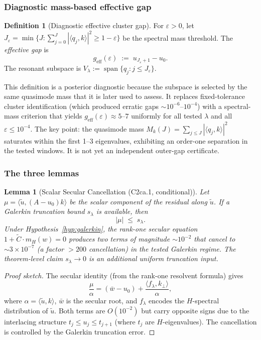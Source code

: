 \documentclass[11pt,a4paper]{article}
\theoremstyle{plain}
\newtheorem{lemma}[theorem]{Lemma}
\theoremstyle{definition}
\newtheorem{definition}[theorem]{Definition}
\begin{document}
\subsubsection{Diagnostic mass-based effective gap}

\begin{definition}[Diagnostic effective cluster gap]\label{def:geff}
For $\varepsilon > 0$, let $J_\varepsilon = \min\{J :
\sum_{j=0}^{J} |\langle q_j, k\rangle|^2 \geq 1 - \varepsilon\}$
be the spectral mass threshold.  The \emph{effective gap} is
\[
  g_{\mathrm{eff}}(\varepsilon) \;:=\; u_{J_\varepsilon + 1} - u_0.
\]
The resonant subspace is $V_\lambda := \operatorname{span}\{q_j :
j \leq J_\varepsilon\}$.
\end{definition}

This definition is a posterior diagnostic because the subspace is
selected by the same quasimode mass that it is later used to assess.
It replaces fixed-tolerance cluster identification
(which produced erratic gaps $\sim 10^{-6}$--$10^{-4}$) with a
spectral-mass criterion that yields $g_{\mathrm{eff}}(\varepsilon)
\approx 5$--$7$ uniformly for all tested $\lambda$ and all
$\varepsilon \leq 10^{-4}$.  The key point: the quasimode mass
$M_k(J) = \sum_{j \leq J} |\langle q_j, k\rangle|^2$ saturates
within the first 1--3 eigenvalues, exhibiting an order-one separation
in the tested windows.  It is not yet an independent outer-gap
certificate.

\subsubsection{The three lemmas}

\begin{lemma}[Scalar Secular Cancellation (C2ca.1, conditional)]
\label{lem:secular}
Let $\mu = \langle \tilde{u}, (A-u_0)k\rangle$ be the scalar
component of the residual along $\tilde{u}$.  If a Galerkin truncation
bound $s_\lambda$ is available, then
\[
  |\mu| \;\leq\; s_\lambda .
\]
Under Hypothesis~\ref{hyp:galerkin}, the rank-one secular equation
$1 + \tilde{C} \cdot m_H(w) = 0$ produces two terms of magnitude
$\sim 10^{-2}$ that cancel to $\sim 3 \times 10^{-7}$ (a factor
$> 200$ cancellation) in the tested Galerkin regime.  The theorem-level
claim $s_\lambda\to0$ is an additional uniform truncation input.
\end{lemma}

\begin{proof}[Proof sketch]
The secular identity (from the rank-one resolvent formula) gives
\[
  \frac{\mu}{\alpha} = (\bar{w} - u_0)
    + \frac{\langle f_\lambda, k_\perp\rangle}{\alpha},
\]
where $\alpha = \langle\tilde{u},k\rangle$, $\bar{w}$ is the secular
root, and $f_\lambda$ encodes the $H$-spectral distribution of
$\tilde{u}$.  Both terms are $O(10^{-2})$ but carry opposite signs
due to the interlacing structure $t_j \leq u_j \leq t_{j+1}$
(where $t_j$ are $H$-eigenvalues).  The cancellation is
controlled by the Galerkin truncation error.
\end{proof}
\end{document}
